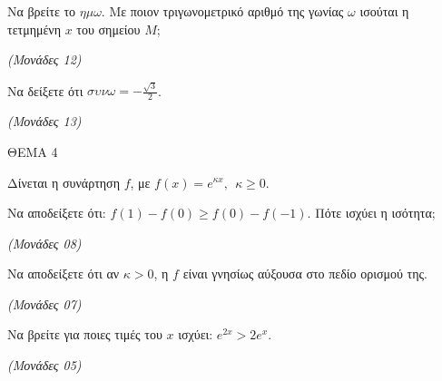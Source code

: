 \documentclass[11pt,a4paper,twoside]{book}
\newcommand{\monades}[1]{\hfill \textit{(Μονάδες #1)}}
\begin{document}
\begin{alist}
\item Να βρείτε το $\eta\mu\omega$. Με ποιον τριγωνομετρικό αριθμό της γωνίας $\omega$ ισούται η τετμημένη $x$ του σημείου $M$;

\monades{12}

\item Να δείξετε ότι $\sigma\upsilon\nu\omega = -\frac{\sqrt{3}}{2}$.

\monades{13}
\end{alist}

\vspace{4mm}

ΘΕΜΑ 4

Δίνεται η συνάρτηση $f$, με $f(x) = e^{\kappa x},\ \ \kappa \geq 0$.

\begin{alist}
\item Να αποδείξετε ότι: $f(1) - f(0) \geq f(0) - f( - 1)$. Πότε ισχύει η ισότητα;

\monades{08}

\item Να αποδείξετε ότι αν $\kappa > 0$, η $f$ είναι γνησίως αύξουσα στο πεδίο ορισμού της.

\monades{07}

\item

\end{alist}
\begin{alist}
\item
  Να βρείτε για ποιες τιμές του $x$ ισχύει: $e^{2x} > 2e^{x}$.

\monades{05}


\end{alist}
\end{document}
